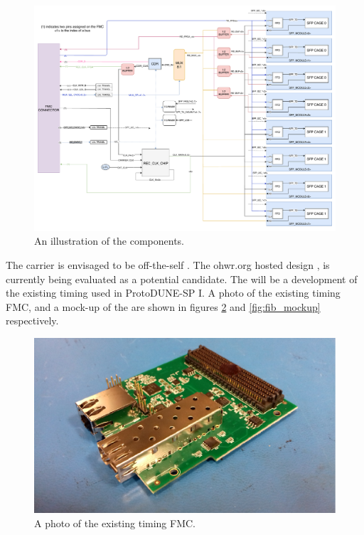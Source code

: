 \documentclass{dune}
\begin{document}
\begin{figure}[h]
\includegraphics[width=\textwidth]{pc065a_block_diagram.pdf}
\caption{An illustration of the  components.}
\label{fig:fib_and_carrier_layout}
\end{figure}

The  carrier is envisaged to be off-the-self . The ohwr.org hosted  design \cite{amc_ohwr}, is currently being evaluated as a potential candidate. The  will be a development of the existing timing  used in ProtoDUNE-SP I. A photo of the existing timing FMC, and a mock-up of the  are shown in figures \ref{fig:timing_fmc} and \ref{fig:fib_mockup} respectively.

\begin{figure}[h]
\includegraphics[width=\textwidth]{timing_fmc.pdf}
\caption{A photo of the existing timing FMC.}
\label{fig:timing_fmc}
\end{figure}
\end{document}
